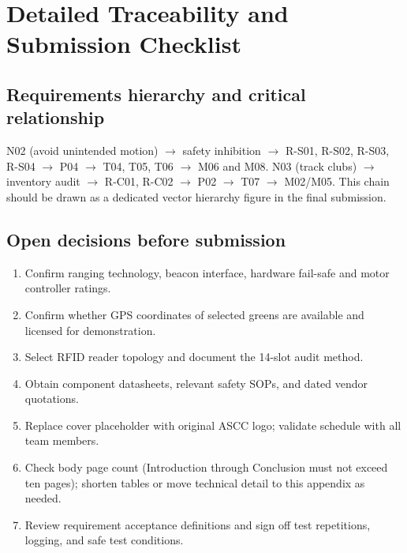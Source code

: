 \section{Detailed Traceability and Submission Checklist}
\subsection{Requirements hierarchy and critical relationship}
N02 (avoid unintended motion) $\rightarrow$ safety inhibition $\rightarrow$ R-S01, R-S02, R-S03, R-S04 $\rightarrow$ P04 $\rightarrow$ T04, T05, T06 $\rightarrow$ M06 and M08. N03 (track clubs) $\rightarrow$ inventory audit $\rightarrow$ R-C01, R-C02 $\rightarrow$ P02 $\rightarrow$ T07 $\rightarrow$ M02/M05. This chain should be drawn as a dedicated vector hierarchy figure in the final submission.
\subsection{Open decisions before submission}
\begin{enumerate}\item Confirm ranging technology, beacon interface, hardware fail-safe and motor controller ratings.\item Confirm whether GPS coordinates of selected greens are available and licensed for demonstration.\item Select RFID reader topology and document the 14-slot audit method.\item Obtain component datasheets, relevant safety SOPs, and dated vendor quotations.\item Replace cover placeholder with original ASCC logo; validate schedule with all team members.\item Check body page count (Introduction through Conclusion must not exceed ten pages); shorten tables or move technical detail to this appendix as needed.\item Review requirement acceptance definitions and sign off test repetitions, logging, and safe test conditions.\end{enumerate}

